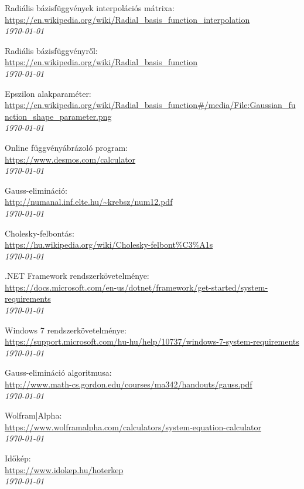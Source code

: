 
\begin{thebibliography}{1} %




 Radiális bázisfüggvények interpolációs mátrixa:\\
\url{https://en.wikipedia.org/wiki/Radial\_basis\_function\_interpolation}\\
\textit{\today}

Radiális bázisfüggvényről:\\
\url{https://en.wikipedia.org/wiki/Radial\_basis\_function}\\
\textit{\today}	

 Epszilon alakparaméter:\\
\url{https://en.wikipedia.org/wiki/Radial\_basis\_function#/media/File:Gaussian\_function\_shape\_parameter.png}\\
\textit{\today}

Online függvényábrázoló program:\\
\url{https://www.desmos.com/calculator}\\
\textit{\today}

 Gauss-elimináció:\\
\url{http://numanal.inf.elte.hu/~krebsz/num12.pdf}\\
\textit{\today}

 Cholesky-felbontás:\\
\url{https://hu.wikipedia.org/wiki/Cholesky-felbont\%C3\%A1s}\\
\textit{\today}	

 .NET Framework rendszerkövetelménye:\\
\url{https://docs.microsoft.com/en-us/dotnet/framework/get-started/system-requirements}\\
\textit{\today}

 Windows 7 rendszerkövetelménye:\\
\url{https://support.microsoft.com/hu-hu/help/10737/windows-7-system-requirements}\\
\textit{\today}

 Gauss-elimináció algoritmusa:\\
\url{http://www.math-cs.gordon.edu/courses/ma342/handouts/gauss.pdf}\\
\textit{\today}

Wolfram|Alpha:\\
\url{https://www.wolframalpha.com/calculators/system-equation-calculator}\\
\textit{\today}

Időkép:\\
\url{https://www.idokep.hu/hoterkep}\\
\textit{\today}

\end{thebibliography}